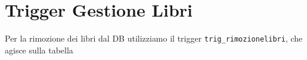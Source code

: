 \newpage

\section{Trigger Gestione Libri}
Per la rimozione dei libri dal DB utilizziamo il trigger \texttt{trig\_rimozionelibri}, che agisce sulla tabella 


